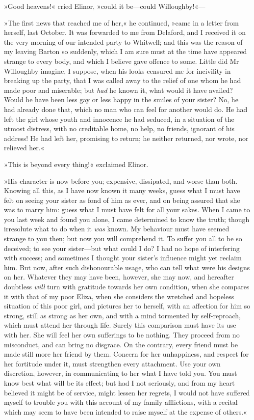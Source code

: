 »Good heavens!« cried Elinor, »could it be—could Willoughby!«—

»The first news that reached me of her,« he continued, »came in a letter from herself, last October. It was forwarded to me from Delaford, and I received it on the very morning of our intended party to Whitwell; and this was the reason of my leaving Barton so suddenly, which I am sure must at the time have appeared strange to every body, and which I believe gave offence to some. Little did Mr Willoughby imagine, I suppose, when his looks censured me for incivility in breaking up the party, that I was called away to the relief of one whom he had made poor and miserable; but \textit{had} he known it, what would it have availed? Would he have been less gay or less happy in the smiles of your sister? No, he had already done that, which no man who can feel for another would do. He had left the girl whose youth and innocence he had seduced, in a situation of the utmost distress, with no creditable home, no help, no friends, ignorant of his address! He had left her, promising to return; he neither returned, nor wrote, nor relieved her.«

»This is beyond every thing!« exclaimed Elinor.

»His character is now before you; expensive, dissipated, and worse than both. Knowing all this, as I have now known it many weeks, guess what I must have felt on seeing your sister as fond of him as ever, and on being assured that she was to marry him: guess what I must have felt for all your sakes. When I came to you last week and found you alone, I came determined to know the truth; though irresolute what to do when it \textit{was} known. My behaviour must have seemed strange to you then; but now you will comprehend it. To suffer you all to be so deceived; to see your sister—but what could I do? I had no hope of interfering with success; and sometimes I thought your sister’s influence might yet reclaim him. But now, after such dishonourable usage, who can tell what were his designs on her. Whatever they may have been, however, she may now, and hereafter doubtless \textit{will} turn with gratitude towards her own condition, when she compares it with that of my poor Eliza, when she considers the wretched and hopeless situation of this poor girl, and pictures her to herself, with an affection for him so strong, still as strong as her own, and with a mind tormented by self-reproach, which must attend her through life. Surely this comparison must have its use with her. She will feel her own sufferings to be nothing. They proceed from no misconduct, and can bring no disgrace. On the contrary, every friend must be made still more her friend by them. Concern for her unhappiness, and respect for her fortitude under it, must strengthen every attachment. Use your own discretion, however, in communicating to her what I have told you. You must know best what will be its effect; but had I not seriously, and from my heart believed it might be of service, might lessen her regrets, I would not have suffered myself to trouble you with this account of my family afflictions, with a recital which may seem to have been intended to raise myself at the expense of others.«

